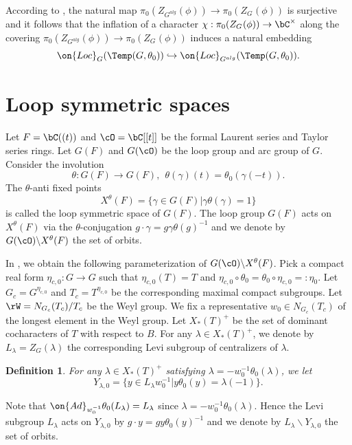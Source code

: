 \documentclass[12pt]{amsart}
\newtheorem{defe}[thm]{Definition}
\theoremstyle{remark}
\begin{document}
According to \cite[page 61]{ABV}, the natural map $\pi_0(Z_{G^{alg}}(\phi))\to \pi_0(Z_{G^{}}(\phi))$ 
is surjective and it follows that 
the inflation of a 
character $\chi:\pi_0(Z_{G^{}}(\phi))\to\bC^\times$
along the covering $\pi_0(Z_{G^{alg}}(\phi))
\to\pi_0(Z_{G^{}}(\phi))$
induces a natural embedding 
\begin{equation}\label{inclusion}
    \on{Loc}_{G}(\Temp(G,\theta_0))\hookrightarrow \on{Loc}_{G^{alg}}(\Temp(G,\theta_0)).
\end{equation}

    







\section{Loop symmetric spaces}\label{loop}
Let $F=\bC((t))$ and $\cO=\bC[[t]]$
be the formal Laurent series and Taylor series rings.
Let $G(F)$ and $G(\cO)$ be the loop group and arc group of $G$. Consider the involution \[\theta:G(F)\to G(F),\ \ \theta(\gamma)(t)=\theta_0(\gamma(-t)).\]
The $\theta$-anti fixed points
\[X^\theta(F)=\{\gamma\in G(F)|\gamma\theta(\gamma)=1\}\]
is called the loop symmetric space of $G(F)$.
The loop group $G(F)$ acts on $X^\theta(F)$ via the 
$\theta$-conjugation $g\cdot\gamma=g\gamma\theta(g)^{-1}$
and we denote by $G(\cO)\backslash X^\theta(F)$ the set of orbits.

In \cite{CY}, we obtain the following parameterization of 
$G(\cO)\backslash X^\theta(F)$. Pick a compact real form 
$\eta_{c,0}:G\to G$ such that $\eta_{c,0}(T)=T$
and $\eta_{c,0}\circ\theta_0=\theta_0\circ\eta_{c,0}=:\eta_0$.
Let $G_c=G^{\eta_{c,0}}$ and $T_c=T^{\eta_{c,0}}$
be the corresponding maximal compact subgroups.
Let $\rW=N_{G_c}(T_c)/T_c$ be the Weyl group.
We fix a representative $w_0\in N_{G_c}(T_c)$
of the longest element in the Weyl group.
Let $X_*(T)^+$ be the set of dominant cocharacters of $T$ with respect to $B$.
For any $\lambda\in X_*(T)^+$, we denote by 
$L_\lambda=Z_G(\lambda)$ the corresponding Levi subgroup of centralizers of $\lambda$.

\begin{defe}
    For any $\lambda\in X_*(T)^+$ satisfying $\lambda=-w_0^{-1}\theta_0(\lambda)$, we let
    \[Y_{\lambda,0}=\{y\in L_\lambda w_0^{-1}|y\theta_0(y)=\lambda(-1)\}.\]
\end{defe}

Note that $\on{Ad}_{w_0^{-1}}\theta_0(L_\lambda)=L_\lambda$ 
since $\lambda=-w_0^{-1}\theta_0(\lambda)$.
Hence the
Levi subgroup $L_\lambda$ acts on $Y_{\lambda,0}$ by $g\cdot y=gy\theta_0(y)^{-1}$ and 
we denote by $L_\lambda\backslash Y_{\lambda,0}$ the set of orbits.
\end{document}
